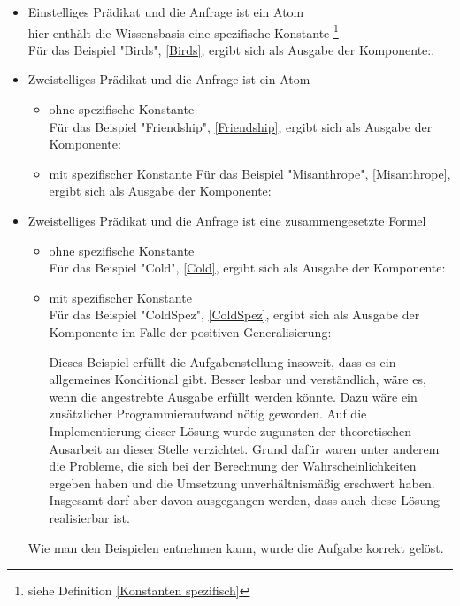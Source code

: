 \documentclass[a4paper, 11pt]{book}
\begin{document}
{\begin{itemize}
	\item Einstelliges Prädikat und die Anfrage ist ein Atom\\
	hier enthält die Wissensbasis eine spezifische Konstante \footnote{siehe Definition \ref{Konstanten spezifisch}}\\
	Für das Beispiel "{}Birds"{}, \ref{Birds}, ergibt sich als Ausgabe der Komponente:.
	
	\item Zweistelliges Prädikat und die Anfrage ist ein Atom
	\begin{itemize}
		\item ohne spezifische Konstante\\
			Für das Beispiel "{}Friendship"{}, \ref{Friendship}, ergibt sich als Ausgabe der Komponente:
				
		\item mit spezifischer Konstante
			Für das Beispiel "{}Misanthrope"{}, \ref{Misanthrope}, ergibt sich als Ausgabe der Komponente:
				
	\end{itemize}
	\item Zweistelliges Prädikat und die Anfrage ist eine zusammengesetzte Formel
\begin{itemize}
	\item ohne spezifische Konstante\\
		Für das Beispiel "{}Cold"{}, \ref{Cold}, ergibt sich als Ausgabe der Komponente:
			
	\item mit spezifischer Konstante\\
		Für das Beispiel "{}ColdSpez"{}, \ref{ColdSpez}, ergibt sich als Ausgabe der Komponente im Falle der positiven Generalisierung:
			
			Dieses Beispiel erfüllt die Aufgabenstellung insoweit, dass es ein allgemeines Konditional gibt. Besser lesbar und verständlich, wäre es, wenn die angestrebte Ausgabe erfüllt werden könnte. Dazu wäre ein zusätzlicher Programmieraufwand nötig geworden. Auf die Implementierung dieser Lösung wurde zugunsten der theoretischen Ausarbeit an dieser Stelle verzichtet. Grund dafür waren unter anderem die Probleme, die sich bei der Berechnung der Wahrscheinlichkeiten ergeben haben und die Umsetzung unverhältnismäßig erschwert haben. Insgesamt darf aber davon ausgegangen werden, dass auch diese Lösung realisierbar ist. 
\end{itemize}

Wie man den Beispielen entnehmen kann, wurde die Aufgabe korrekt gelöst. 


\end{itemize}}
\end{document}
